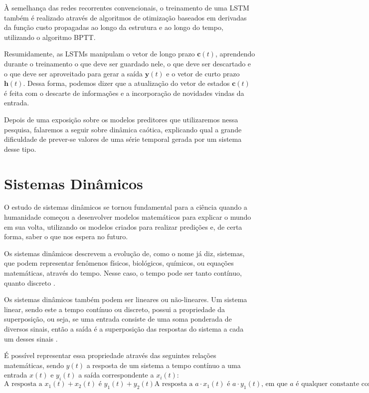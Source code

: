 \documentclass[a4paper, 12pt]{article}
\begin{document}
À semelhança das redes recorrentes convencionais, o treinamento de uma LSTM também é realizado através de algoritmos de otimização baseados em derivadas da função custo propagadas ao longo da estrutura e ao longo do tempo, utilizando o algoritmo BPTT.

Resumidamente, as LSTMs manipulam o vetor de longo prazo $\mathbf{c}(t)$, aprendendo durante o treinamento o que deve ser guardado nele, o que deve ser descartado e o que deve ser aproveitado para gerar a saída $\mathbf{y}(t)$ e o vetor de curto prazo $\mathbf{h}(t)$. Dessa forma, podemos dizer que a atualização do vetor de estados $\mathbf{c}(t)$ é feita com o descarte de informações e a incorporação de novidades vindas da entrada.

Depois de uma exposição sobre os modelos preditores que utilizaremos nessa pesquisa, falaremos a seguir sobre dinâmica caótica, explicando qual a grande dificuldade de prever-se valores de uma série temporal gerada por um sistema desse tipo.

\section{Sistemas Dinâmicos}
O estudo de sistemas dinâmicos se tornou fundamental para a ciência quando a humanidade começou a desenvolver modelos matemáticos para explicar o mundo em sua volta, utilizando os modelos criados para realizar predições e, de certa forma, saber o que nos espera no futuro.

Os sistemas dinâmicos descrevem a evolução de, como o nome já diz, sistemas, que podem representar fenômenos físicos, biológicos, químicos, ou equações matemáticas, através do tempo. Nesse caso, o tempo pode ser tanto contínuo, quanto discreto \cite{kluever2020dynamic}.

Os sistemas dinâmicos também podem ser lineares ou não-lineares. Um sistema linear, sendo este a tempo contínuo ou discreto, possui a propriedade da superposição, ou seja, se uma entrada consiste de uma soma ponderada de diversos sinais, então a saída é a superposição das respostas do sistema a cada um desses sinais \cite{oppenheim2014signals}. 

É possível representar essa propriedade através das seguintes relações matemáticas, sendo $y(t)$ a resposta de um sistema a tempo contínuo a uma entrada $x(t)$ e $y_i(t)$ a saída correspondente a $x_i(t)$:
\begin{subequations}
\begin{equation}\label{eq:linear-eq-1}
\text{A resposta a } x_1(t) + x_2(t) \text{ é } y_1(t) + y_2(t)
\end{equation}
\begin{equation}\label{eq:linear-eq-2}
\text{A resposta a } a\cdot x_1(t) \text{ é } a\cdot y_1(t)\text{, em que } a \text{ é qualquer constante complexa.}
\end{equation}
\end{subequations}
\end{document}

